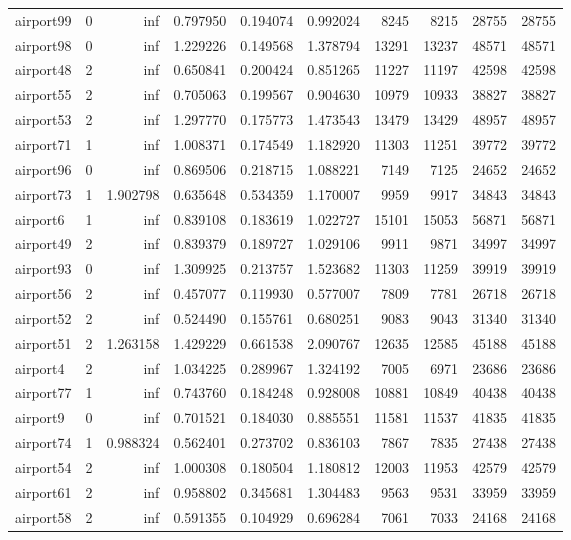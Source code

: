 \begin{longtable}{|l|r|r|r|r|r|r|r|r|r|}
airport99 & 0 & inf & 0.797950 & 0.194074 & 0.992024 & 8245 & 8215 & 28755 & 28755 \\
airport98 & 0 & inf & 1.229226 & 0.149568 & 1.378794 & 13291 & 13237 & 48571 & 48571 \\
airport48 & 2 & inf & 0.650841 & 0.200424 & 0.851265 & 11227 & 11197 & 42598 & 42598 \\
airport55 & 2 & inf & 0.705063 & 0.199567 & 0.904630 & 10979 & 10933 & 38827 & 38827 \\
airport53 & 2 & inf & 1.297770 & 0.175773 & 1.473543 & 13479 & 13429 & 48957 & 48957 \\
airport71 & 1 & inf & 1.008371 & 0.174549 & 1.182920 & 11303 & 11251 & 39772 & 39772 \\
airport96 & 0 & inf & 0.869506 & 0.218715 & 1.088221 & 7149 & 7125 & 24652 & 24652 \\
airport73 & 1 & 1.902798 & 0.635648 & 0.534359 & 1.170007 & 9959 & 9917 & 34843 & 34843 \\
airport6 & 1 & inf & 0.839108 & 0.183619 & 1.022727 & 15101 & 15053 & 56871 & 56871 \\
airport49 & 2 & inf & 0.839379 & 0.189727 & 1.029106 & 9911 & 9871 & 34997 & 34997 \\
airport93 & 0 & inf & 1.309925 & 0.213757 & 1.523682 & 11303 & 11259 & 39919 & 39919 \\
airport56 & 2 & inf & 0.457077 & 0.119930 & 0.577007 & 7809 & 7781 & 26718 & 26718 \\
airport52 & 2 & inf & 0.524490 & 0.155761 & 0.680251 & 9083 & 9043 & 31340 & 31340 \\
airport51 & 2 & 1.263158 & 1.429229 & 0.661538 & 2.090767 & 12635 & 12585 & 45188 & 45188 \\
airport4 & 2 & inf & 1.034225 & 0.289967 & 1.324192 & 7005 & 6971 & 23686 & 23686 \\
airport77 & 1 & inf & 0.743760 & 0.184248 & 0.928008 & 10881 & 10849 & 40438 & 40438 \\
airport9 & 0 & inf & 0.701521 & 0.184030 & 0.885551 & 11581 & 11537 & 41835 & 41835 \\
airport74 & 1 & 0.988324 & 0.562401 & 0.273702 & 0.836103 & 7867 & 7835 & 27438 & 27438 \\
airport54 & 2 & inf & 1.000308 & 0.180504 & 1.180812 & 12003 & 11953 & 42579 & 42579 \\
airport61 & 2 & inf & 0.958802 & 0.345681 & 1.304483 & 9563 & 9531 & 33959 & 33959 \\
airport58 & 2 & inf & 0.591355 & 0.104929 & 0.696284 & 7061 & 7033 & 24168 & 24168 \\

\end{longtable}
